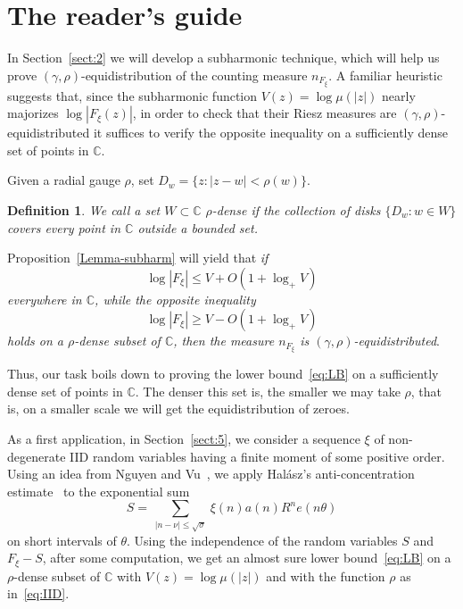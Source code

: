 \documentclass[11pt]{amsart}
\numberwithin{equation}{section}
\newtheorem{definition}{Definition}
\newcommand{\bC}{\mathbb C}
\begin{document}
\section{The reader's guide}
 
In Section~\ref{sect:2} we will develop a subharmonic technique, which will help us prove
$(\gamma, \rho)$-equidistribution of the counting measure $n_{F_\xi}$.
A familiar heuristic suggests that, since the subharmonic function $V(z)=\log\mu(|z|)$ nearly majorizes $\log|F_\xi(z)|$,
in order to check that their Riesz
measures are $(\gamma, \rho)$-equidistributed it suffices to verify the opposite inequality on
a sufficiently dense set of points in $\bC$.

Given a radial gauge $\rho$, set $D_w = \{z\colon |z-w|<\rho(w)\}$.

\begin{definition}\label{def:rho-dense}
We call a set $W\subset \bC$ $\rho$-dense
if the collection of disks $\{D_w\colon w\in W\}$ covers every point in $\bC$ outside
a bounded set.
\end{definition}

Proposition~\ref{Lemma-subharm} will yield  that {\em if
\[
\log|F_\xi| \le V + O(1 + \log_+ V)
\]
everywhere in $\bC$, while the opposite inequality
\begin{equation}\label{eq:LB}
\log|F_\xi| \ge V - O(1 + \log_+ V)
\end{equation}
holds on a $\rho$-dense subset of $\bC$, then the measure $n_{F_\xi}$ is
$(\gamma, \rho)$-equidistributed}.

\medskip
Thus, our task boils down to proving the lower bound~\eqref{eq:LB} on a sufficiently dense
set of points in $\bC$. The denser this set is, the smaller we may take $\rho$, that is,
on a smaller scale we will get the equidistribution of zeroes.

As a first application, in Section~\ref{sect:5},
we consider a sequence $\xi$
of non-degenerate IID random variables
having a finite moment of some positive order. Using an idea from Nguyen and Vu~\cite{NV}, we apply
Hal\'asz's anti-concentration estimate~\cite{Halasz} to the exponential sum
\[
S = \, \sum_{|n-\nu|\le \sqrt\sigma}\, \xi(n) a(n) R^n e(n\theta)
\]
on short intervals of $\theta$. Using the independence of the random variables
$S$ and $F_\xi - S$, after some computation, we get an almost sure lower bound~\eqref{eq:LB}
on a $\rho$-dense subset of $\bC$ with $V(z)=\log\mu(|z|)$ and with
the function $\rho$ as in~\eqref{eq:IID}.
\end{document}

